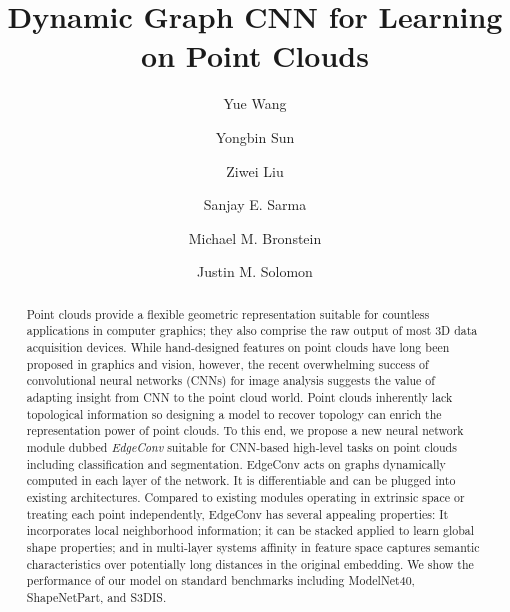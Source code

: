 \documentclass[acmtog]{acmart}
\begin{document}
\title{Dynamic Graph CNN for Learning on Point Clouds}

\author{Yue Wang}

\author{Yongbin Sun}

\author{Ziwei Liu}

\author{Sanjay E. Sarma}

\author{Michael M. Bronstein}

\author{Justin M. Solomon}

\newcommand\BigBox{\vcenter{\hbox{\scalebox{2}{}}}}
\newcommand\bigsquare{\mathop{\BigBox}\limits}

\begin{abstract}
Point clouds provide a flexible geometric representation suitable for countless applications in computer graphics; they also comprise the raw output of most 3D data acquisition devices. While hand-designed features on point clouds have long been proposed in graphics and vision, however, the recent overwhelming success of convolutional neural networks (CNNs) for image analysis suggests the value of adapting insight from CNN to the point cloud world. Point clouds inherently lack topological information so designing a model to recover topology can enrich the representation power of point clouds. To this end, we propose a new neural network module dubbed \emph{EdgeConv} suitable for CNN-based high-level tasks on point clouds including classification and segmentation. EdgeConv acts on graphs dynamically computed in each layer of the network. It is differentiable and can be plugged into existing architectures.
Compared to existing modules operating in extrinsic space or treating each point independently, EdgeConv has several appealing properties:  It incorporates local neighborhood information; it can be stacked applied to learn global shape properties; and in multi-layer systems affinity in feature space captures semantic characteristics over potentially long distances in the original embedding. We show the performance of our model on standard benchmarks including ModelNet40, ShapeNetPart, and S3DIS.
\end{abstract} 
\end{document}
